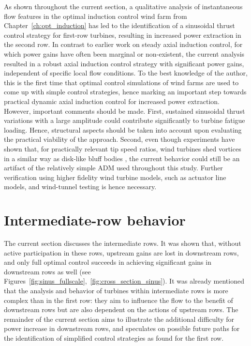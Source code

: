 As shown throughout the current section, a qualitative analysis of instantaneous flow features in the optimal induction control wind farm from Chapter~\ref{ch:opt_induction} has led to the identification of a sinusoidal thrust control strategy for first-row turbines, resulting in increased power extraction in the second row. In contrast to earlier work on steady axial induction control, for which power gains have often been marginal or non-existent, the current analysis resulted in a robust axial induction control strategy with significant power gains, independent of specific local flow conditions. To the best knowledge of the author, this is the first time that optimal control simulations of wind farms are used to come up with simple control strategies, hence marking an important step towards practical dynamic axial induction control for increased power extraction. However, important comments should be made. First, sustained sinusoidal thrust variations with a large amplitude could contribute significantly to turbine fatigue loading. Hence, structural aspects should be taken into account upon evaluating the practical viability of the approach. Second, even though experiments have shown that, for practically relevant tip speed ratios, wind turbines shed vortices in a similar way as disk-like bluff bodies \citep{medici2006measurements}, the current behavior could still be an artifact of the relatively simple ADM used throughout this study. Further verification using higher fidelity wind turbine models, such as actuator line models, and wind-tunnel testing is hence necessary. 

\section{Intermediate-row behavior}\label{sec:analysis_intermediate}
The current section discusses the intermediate rows. It was shown that, without active participation in these rows, upstream gains are lost in downstream rows, and only full optimal control succeeds in achieving significant gains in downstream rows as well (see Figures~\ref{fig:sinus_fullscale},~\ref{fig:cross_section_sinus}). It was already mentioned that the analysis and behavior of turbines within intermediate rows is more complex than in the first row: they aim to influence the flow to the benefit of downstream rows but are also dependent on the actions of upstream rows. The remainder of the current section aims to illustrate the additional difficulty for power increase in downstream rows, and speculates on possible future paths for the identification of simplified control strategies as found for the first row.

